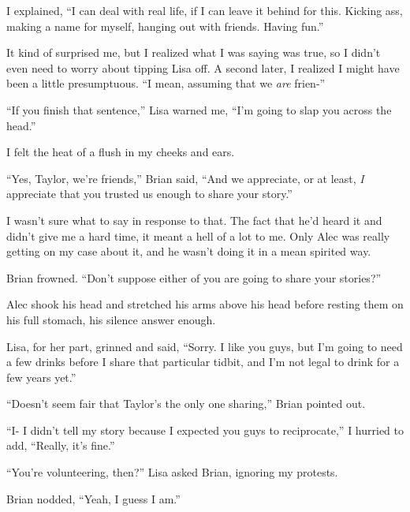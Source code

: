 I explained, ``I can deal with real life, if I can leave it behind for this.  Kicking ass, making a name for myself, hanging out with friends.  Having fun.''



It kind of surprised me, but I realized what I was saying was true, so I didn't even need to worry about tipping Lisa off.  A second later, I realized I might have been a little presumptuous.  ``I mean, assuming that we \emph{are} frien-''



``If you finish that sentence,'' Lisa warned me, ``I'm going to slap you across the head.''



I felt the heat of a flush in my cheeks and ears.



``Yes, Taylor, we're friends,'' Brian said, ``And we appreciate, or at least, \emph{I} appreciate that you trusted us enough to share your story.''



I wasn't sure what to say in response to that.  The fact that he'd heard it and didn't give me a hard time, it meant a hell of a lot to me.  Only Alec was really getting on my case about it, and he wasn't doing it in a mean spirited way.



Brian frowned.  ``Don't suppose either of you are going to share your stories?''



Alec shook his head and stretched his arms above his head before resting them on his full stomach, his silence answer enough.



Lisa, for her part, grinned and said, ``Sorry.  I like you guys, but I'm going to need a few drinks before I share that particular tidbit, and I'm not legal to drink for a few years yet.''



``Doesn't seem fair that Taylor's the only one sharing,'' Brian pointed out.



``I- I didn't tell my story because I expected you guys to reciprocate,'' I hurried to add, ``Really, it's fine.''



``You're volunteering, then?'' Lisa asked Brian, ignoring my protests.



Brian nodded, ``Yeah, I guess I am.''

















